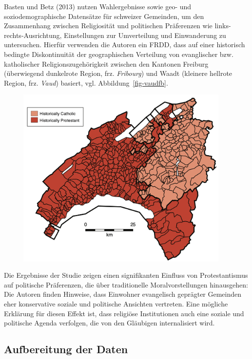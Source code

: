 \documentclass[
  a4paper,
  DIV=11,
  oneside]{scrreprt}
\begin{document}
Basten und Betz (2013) nutzen Wahlergebnisse sowie geo- und
soziodemographische Datensätze für schweizer Gemeinden, um den
Zusammenhang zwischen Religiosität und politischen Präferenzen wie
links-rechts-Ausrichtung, Einstellungen zur Umverteilung und
Einwanderung zu untersuchen. Hierfür verwenden die Autoren ein FRDD,
dass auf einer historisch bedingte Diskontinuität der geographischen
Verteilung von evanglischer bzw. katholischer Religionszugehörigkeit
zwischen den Kantonen Freiburg (überwiegend dunkelrote Region, frz.
\emph{Fribourg}) und Waadt (kleinere hellrote Region, frz. \emph{Vaud})
basiert, vgl. Abbildung~\ref{fig-vaudfb}.

\begin{figure}[t]


{\centering \includegraphics[width=4.16667in,height=\textheight]{img/WaadtFribourg.png}

}

\end{figure}

Die Ergebnisse der Studie zeigen einen signifikanten Einfluss von
Protestantismus auf politische Präferenzen, die über traditionelle
Moralvorstellungen hinausgehen: Die Autoren finden Hinweise, dass
Einwohner evangelisch geprägter Gemeinden eher konservative soziale und
politische Ansichten vertreten. Eine mögliche Erklärung für diesen
Effekt ist, dass religiöse Institutionen auch eine soziale und
politische Agenda verfolgen, die von den Gläubigen internalisiert wird.

\hypertarget{aufbereitung-der-daten}{%
\subsection{Aufbereitung der Daten}\label{aufbereitung-der-daten}}
\end{document}
